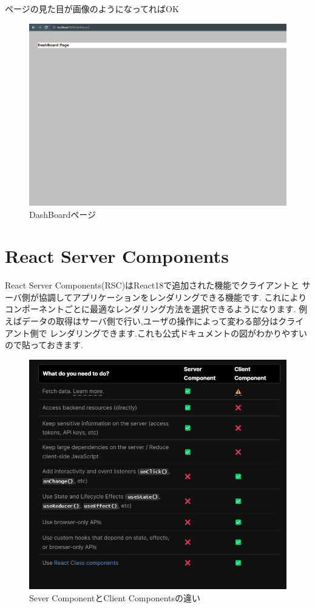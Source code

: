 ページの見た目が画像のようになってればOK


\begin{figure}[H]
  \centering
  \includegraphics[width=12cm]{./image/03-Tech/chap4/03.png}
  \caption{DashBoardページ}
\end{figure}










\section{React Server Components}
React Server Components(RSC)はReact18で追加された機能でクライアントと
サーバ側が協調してアプリケーションをレンダリングできる機能です.
これによりコンポーネントごとに最適なレンダリング方法を選択できるようになります.
例えばデータの取得はサーバ側で行い,ユーザの操作によって変わる部分はクライアント側で
レンダリングできます.これも公式ドキュメントの図がわかりやすいので貼っておきます.


\begin{figure}[H]
  \centering
  \includegraphics[width=12cm]{./image/03-Tech/chap4/04.png}
  \caption{Sever ComponentとClient Componentsの違い}
\end{figure}



